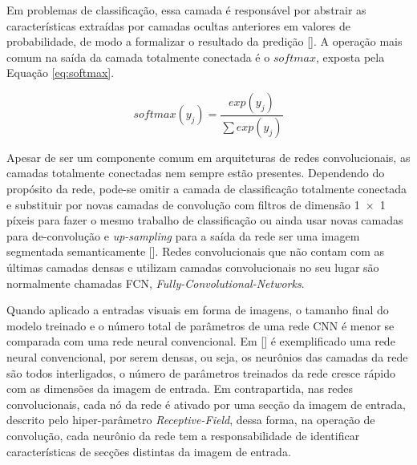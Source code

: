 \begin{enumerate}
            Em problemas de classificação, essa camada é responsável por abstrair as características extraídas por camadas ocultas anteriores em 
            valores de probabilidade, de modo a formalizar o resultado da predição []. A operação mais comum na saída 
            da camada totalmente conectada é o $softmax$, exposta pela Equação \ref{eq:softmax}.
            
            \begin{equation}
                \label{eq:softmax}
                softmax(y_j) = \frac{exp(y_j)}{\sum exp(y_j)}
            \end{equation}
            
            Apesar de ser um componente comum em arquiteturas de redes convolucionais, as camadas totalmente conectadas nem sempre estão 
            presentes. Dependendo do propósito da rede, pode-se omitir a camada de classificação totalmente conectada e substituir por novas camadas 
            de convolução com filtros de dimensão 1 × 1 píxeis para fazer o mesmo trabalho de classificação ou ainda usar novas camadas para 
            de-convolução e \textit{up-sampling} para a saída da rede ser uma imagem segmentada semanticamente []. Redes convolucionais 
            que não contam com as últimas camadas densas e utilizam camadas convolucionais no seu lugar são normalmente chamadas FCN, \textit{Fully-Convolutional-Networks}.
\end{enumerate}

Quando aplicado a entradas visuais em forma de imagens, o tamanho final do modelo treinado e o número total de parâmetros de uma rede CNN é menor se 
comparada com uma rede neural convencional. Em [] é exemplificado uma rede neural convencional, por serem densas, ou seja, os 
neurônios das camadas da rede são todos interligados, o número de parâmetros treinados da rede cresce rápido com as dimensões da imagem de entrada. 
Em contrapartida, nas redes convolucionais, cada nó da rede é ativado por uma secção da imagem de entrada, descrito pelo hiper-parâmetro \textit{Receptive-Field}, 
dessa forma, na operação de convolução, cada neurônio da rede tem a responsabilidade de identificar características de secções distintas da imagem de entrada.

